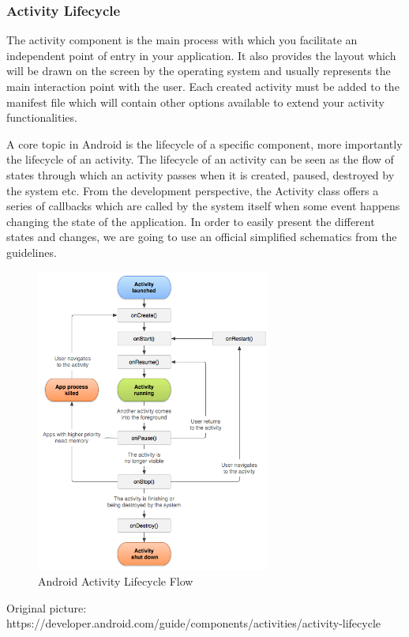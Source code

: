 \subsubsection{Activity Lifecycle}

The activity component is the main process with which you facilitate an independent point of entry in your application. It also provides the layout which will be drawn on the screen by the operating system and usually represents the main interaction point with the user. Each created activity must be added to the manifest file which will contain other options available to extend your activity functionalities.

A core topic in Android is the lifecycle of a specific component, more importantly the lifecycle of an activity. The lifecycle of an activity can be seen as the flow of states through which an activity passes when it is created, paused, destroyed by the system etc. From the development perspective, the Activity class offers a series of callbacks which are called by the system itself when some event happens changing the state of the application. In order to easily present the different states and changes, we are going to use an official simplified schematics from the guidelines.

\begin{figure}[H]
\centering
\includegraphics[height=10cm]{images/ActivityLifecycle.png} 
\caption{Android Activity Lifecycle Flow}
\label{fig:androidactivitylifecycle}
\end{figure}
\begin{flushright}
Original picture: https://developer.android.com/guide/components/activities/activity-lifecycle
\end{flushright}